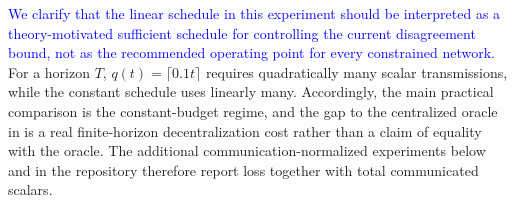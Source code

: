 \textcolor{blue}{We clarify that the linear schedule in this experiment should be interpreted as a theory-motivated sufficient schedule for controlling the current disagreement bound, not as the recommended operating point for every constrained network.}
For a horizon $T$, $q(t)=\lceil 0.1t\rceil$ requires quadratically many scalar transmissions, while the constant schedule uses linearly many.
Accordingly, the main practical comparison is the constant-budget regime, and the gap to the centralized oracle in  is a real finite-horizon decentralization cost rather than a claim of equality with the oracle.
The additional communication-normalized experiments below and in the repository therefore report loss together with total communicated scalars.
